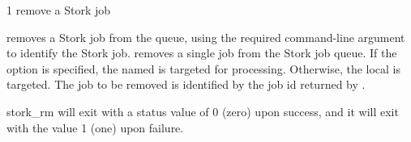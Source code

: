 \begin{ManPage}{\label{man-stork-rm}}{1}
{remove a Stork job}
\Synopsis {}
\ToolArgsBase

\Storkname
{}



\Description 

 removes a Stork job from the queue,
using the required command-line argument to identify the Stork job.
 removes a single job from the Stork job queue.  
If the  option is specified, the named  is targeted
for processing.  Otherwise, the local  is targeted.
The job to be removed is identified by the job id returned by  .

\begin{Options}
	\ToolArgsBaseDesc
	\StorknameDesc
\end{Options}

\ExitStatus

stork\_rm will exit with a status value of 0 (zero) upon success,
and it will exit with the value 1 (one) upon failure.

\end{ManPage}
